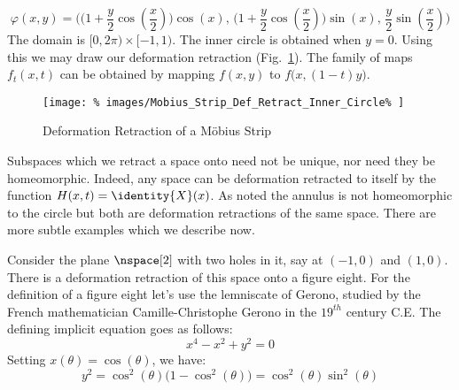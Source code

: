 \documentclass{book}                                                           %
\begin{document}
                \begin{equation}
                    \varphi(x,y)=
                    \Big(\big(1+\frac{y}{2}\cos(\frac{x}{2})\big)\cos(x),\,
                         \big(1+\frac{y}{2}\cos(\frac{x}{2})\big)\sin(x),\,
                         \frac{y}{2}\sin(\frac{x}{2})\Big)
                \end{equation}
                The domain is $[0,2\pi)\times[\minus{1},1)$. The inner circle is
                obtained when $y=0$. Using this we may draw our deformation
                retraction (Fig.~\ref{fig:Def_Retract_Mobius_Strip}). The
                family of maps $f_{t}(x,t)$ can be obtained by mapping $f(x,y)$
                to $f\big(x,(1-t)y\big)$.
                \begin{figure}[H]
                    \centering
                    \captionsetup{type=figure}
                    \texttt{[image: \%
                        images/Mobius\_Strip\_Def\_Retract\_Inner\_Circle\%
                    ]}
                    \caption{Deformation Retraction of a M\"{o}bius Strip}
                    \label{fig:Def_Retract_Mobius_Strip}
                \end{figure}
                Subspaces which we retract a space onto need not be unique, nor
                need they be homeomorphic. Indeed, any space can be deformation
                retracted to itself by the function $H(x,t)=\identity{X}(x)$.
                As noted the annulus is not homeomorphic to the circle but both
                are deformation retractions of the same space. There are more
                subtle examples which we describe now.
                \par\hfill\par
                Consider the plane $\nspace[2]$ with two holes in it,
                say at $(\minus{1},0)$ and $(1,0)$. There is a deformation
                retraction of this space onto a figure eight. For the definition
                of a figure eight let's use the lemniscate of Gerono, studied
                by the French mathematician Camille-Christophe Gerono in
                the $19^{th}$ century C.E. The defining implicit equation goes
                as follows:
                \begin{equation}
                    x^{4}-x^{2}+y^{2}=0
                \end{equation}
                Setting $x(\theta)=\cos(\theta)$, we have:
                \begin{equation}
                    y^{2}=\cos^{2}(\theta)\big(1-\cos^{2}(\theta)\big)
                         =\cos^{2}(\theta)\sin^{2}(\theta)
                \end{equation}
\end{document}
